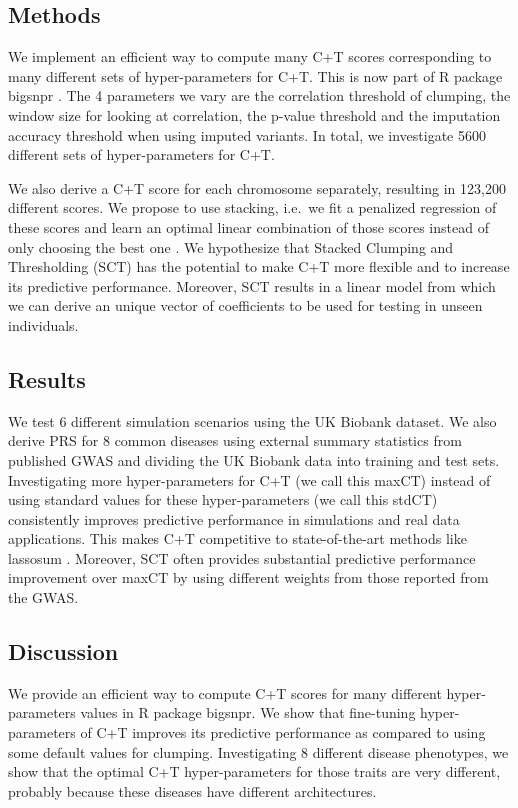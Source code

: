 \subsection{Methods}

We implement an efficient way to compute many C+T scores corresponding to many different sets of hyper-parameters for C+T. This is now part of R package bigsnpr \cite[]{prive2018efficient}. 
The 4 parameters we vary are the correlation threshold of clumping, the window size for looking at correlation, the p-value threshold and the imputation accuracy threshold when using imputed variants.
In total, we investigate 5600 different sets of hyper-parameters for C+T.

We also derive a C+T score for each chromosome separately, resulting in 123,200 different scores.
We propose to use stacking, i.e.\ we fit a penalized regression of these scores and learn an optimal linear combination of those scores instead of only choosing the best one \cite[]{breiman1996stacked}.
We hypothesize that Stacked Clumping and Thresholding (SCT) has the potential to make C+T more flexible and to increase its predictive performance.
Moreover, SCT results in a linear model from which we can derive an unique vector of coefficients to be used for testing in unseen individuals.

\subsection{Results}

We test 6 different simulation scenarios using the UK Biobank dataset. We also derive PRS for 8 common diseases using external summary statistics from published GWAS and dividing the UK Biobank data into training and test sets.
Investigating more hyper-parameters for C+T (we call this maxCT) instead of using standard values for these hyper-parameters (we call this stdCT) consistently improves predictive performance in simulations and real data applications.
This makes C+T competitive to state-of-the-art methods like lassosum \cite[]{mak2017polygenic}.
Moreover, SCT often provides substantial predictive performance improvement over maxCT by using different weights from those reported from the GWAS.

\subsection{Discussion}

We provide an efficient way to compute C+T scores for many different hyper-parameters values in R package bigsnpr. We show that fine-tuning hyper-parameters of C+T improves its predictive performance as compared to using some default values for clumping. Investigating 8 different disease phenotypes, we show that the optimal C+T hyper-parameters for those traits are very different, probably because these diseases have different architectures.

